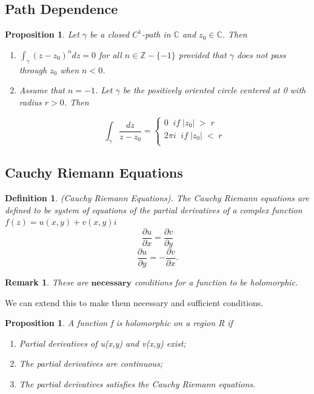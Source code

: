 \documentclass[twoside]{article}
\newtheorem{proposition}[theorem]{Proposition}
\newtheorem{remark}[theorem]{Remark}
\newtheorem{definition}[theorem]{Definition}
\begin{document}
\subsection{Path Dependence}

\begin{proposition}Let $\gamma$ be a closed $C^1$-path in $\mathbb{C}$ and $z_0 \in \mathbb{C}$. Then 
\begin{enumerate}
\item $\int_{\gamma}(z - z_0)^ndz = 0$ for all $n \in \mathbb{Z} - \{-1\}$ provided that $\gamma$ does not pass through $z_0$ when $n < 0$.

\item Assume that $n = -1$. Let $\gamma$ be the positively oriented circle centered at 0 with radius $r > 0$. Then

$$
\int_{\gamma}\frac{dz}{z - z_0} = 
\begin{cases}
  0 \;\; if \;|z_0| \;> \;r \\ 
  2\pi i \;\; if \;|z_0| \;< \;r \\
\end{cases}
$$
\end{enumerate}

\end{proposition}

\subsection{Cauchy Riemann Equations}

\begin{definition}(Cauchy Riemann Equations). The Cauchy Riemann equations are defined to be system of equations of the partial derivatives of a complex function $f(z) = u(x,y) + v(x,y)i$
$$
\frac{\partial u}{\partial x} = \frac{\partial v}{\partial y}
$$
$$
\frac{\partial u}{\partial y} = -\frac{\partial v}{\partial x}.
$$
\end{definition}

\begin{remark} These are $\textbf{necessary}$ conditions for a function to be holomorphic.
\end{remark}

We can extend this to make them necessary and sufficient conditions.

\begin{proposition} A function f is holomorphic on a region R if
\begin{enumerate}
    \item Partial derivatives of u(x,y) and v(x,y) exist; 
    \item The partial derivatives are continuous;
    \item The partial derivatives satisfies the Cauchy Riemann equations.
\end{enumerate}
\end{proposition}
\end{document}
